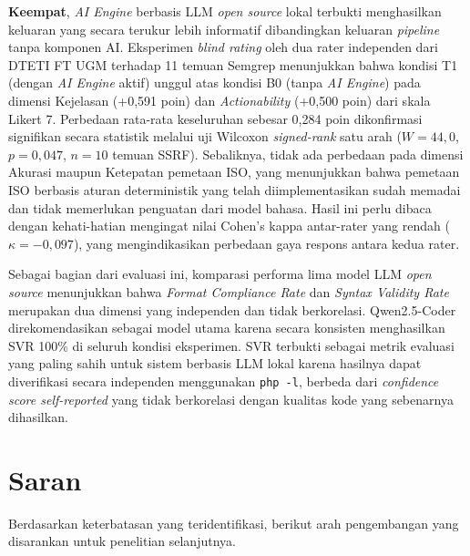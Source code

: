 \textbf{Keempat}, \textit{AI Engine} berbasis LLM \textit{open source}
lokal terbukti menghasilkan keluaran yang secara terukur lebih
informatif dibandingkan keluaran \textit{pipeline} tanpa komponen AI.
Eksperimen \textit{blind rating} oleh dua rater independen dari DTETI
FT UGM terhadap 11 temuan Semgrep menunjukkan bahwa kondisi T1
(dengan \textit{AI Engine} aktif) unggul atas kondisi B0 (tanpa
\textit{AI Engine}) pada dimensi Kejelasan (+0,591 poin) dan
\textit{Actionability} (+0,500 poin) dari skala Likert 7. Perbedaan
rata-rata keseluruhan sebesar 0,284 poin dikonfirmasi signifikan
secara statistik melalui uji Wilcoxon \textit{signed-rank} satu arah
($W = 44{,}0$, $p = 0{,}047$, $n = 10$ temuan SSRF). Sebaliknya,
tidak ada perbedaan pada dimensi Akurasi maupun Ketepatan pemetaan
ISO, yang menunjukkan bahwa pemetaan ISO berbasis aturan deterministik
yang telah diimplementasikan sudah memadai dan tidak memerlukan
penguatan dari model bahasa. Hasil ini perlu dibaca dengan
kehati-hatian mengingat nilai Cohen's kappa antar-rater yang rendah
($\kappa = {-0{,}097}$), yang mengindikasikan perbedaan gaya respons
antara kedua rater.

Sebagai bagian dari evaluasi ini, komparasi performa lima model LLM
\textit{open source} menunjukkan bahwa \textit{Format Compliance Rate}
dan \textit{Syntax Validity Rate} merupakan dua dimensi yang independen
dan tidak berkorelasi. Qwen2.5-Coder direkomendasikan sebagai model
utama karena secara konsisten menghasilkan SVR 100\% di seluruh
kondisi eksperimen. SVR terbukti sebagai metrik evaluasi yang paling
sahih untuk sistem berbasis LLM lokal karena hasilnya dapat
diverifikasi secara independen menggunakan \texttt{php -l}, berbeda
dari \textit{confidence score self-reported} yang tidak berkorelasi
dengan kualitas kode yang sebenarnya dihasilkan.


\section{Saran}

Berdasarkan keterbatasan yang teridentifikasi, berikut arah 
pengembangan yang disarankan untuk penelitian selanjutnya.

